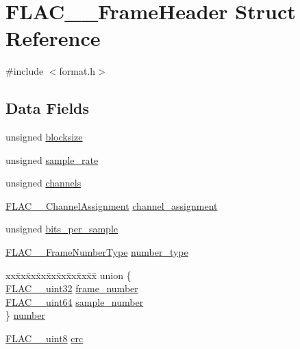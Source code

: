 \hypertarget{struct_f_l_a_c_____frame_header}{}\section{F\+L\+A\+C\+\_\+\+\_\+\+Frame\+Header Struct Reference}
\label{struct_f_l_a_c_____frame_header}


{\ttfamily \#include $<$format.\+h$>$}

\subsection*{Data Fields}
\begin{DoxyCompactItemize}
\item 
unsigned \hyperlink{struct_f_l_a_c_____frame_header_ace760def6dcbbde3d9d140e5bfda34b3}{blocksize}
\item 
unsigned \hyperlink{struct_f_l_a_c_____frame_header_acc23daa576f4e75885bf4f2b69cee1be}{sample\+\_\+rate}
\item 
unsigned \hyperlink{struct_f_l_a_c_____frame_header_a5950c6e4f03ad81f4a03c8c6188b9bf5}{channels}
\item 
\hyperlink{group__flac__format_ga79855f8525672e37f299bbe02952ef9c}{F\+L\+A\+C\+\_\+\+\_\+\+Channel\+Assignment} \hyperlink{struct_f_l_a_c_____frame_header_a9a31f752e16da9d690f8d5ff85aed89c}{channel\+\_\+assignment}
\item 
unsigned \hyperlink{struct_f_l_a_c_____frame_header_ae1f4af58cbbb837adf670d12bc4e86f3}{bits\+\_\+per\+\_\+sample}
\item 
\hyperlink{group__flac__format_ga8fe9ebc78386cd2a3d23b7b8e3818e1c}{F\+L\+A\+C\+\_\+\+\_\+\+Frame\+Number\+Type} \hyperlink{struct_f_l_a_c_____frame_header_a7a62ec09e6f3029297179ef65377265f}{number\+\_\+type}
\item 
\begin{tabbing}
xx\=xx\=xx\=xx\=xx\=xx\=xx\=xx\=xx\=\kill
union \{\\
\>\hyperlink{ordinals_8h_a9c4005ea7ef8d564b0cc993cdd0e4e5e}{FLAC\_\_uint32} \hyperlink{struct_f_l_a_c_____frame_header_aa8f183fd8bcb5b73c392ae9ba7da4dbb}{frame\_number}\\
\>\hyperlink{ordinals_8h_aa78c8c70a3eb8a58af7436f278acde8e}{FLAC\_\_uint64} \hyperlink{struct_f_l_a_c_____frame_header_a4bbe555be68bd9fa48a22624233ee9f0}{sample\_number}\\
\} \hyperlink{struct_f_l_a_c_____frame_header_a66282f7bdd126fbbc5374a9a49cf74e5}{number}\\

\end{tabbing}\item 
\hyperlink{ordinals_8h_ac49472999bc6507b4ded92a922168adf}{F\+L\+A\+C\+\_\+\+\_\+uint8} \hyperlink{struct_f_l_a_c_____frame_header_a980438c380697df6f332cb27dc4672c4}{crc}
\end{DoxyCompactItemize}



